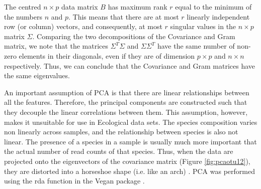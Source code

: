 The centred $n \times p$ data matrix $B$ has maximum rank $r$ equal to the minimum of the numbers $n$ and $p$. This means that there are at most $r$ linearly independent row (or column) vectors, and consequently, at most $r$ singular values in the $n \times p$ matrix $\Sigma$. Comparing the two decompositions of the Covariance and Gram matrix, we note that the matrices $\Sigma^T \Sigma$ and $\Sigma \Sigma^T$ have the same number of non-zero elements in their diagonals, even if they are of dimension $p \times p$ and $n \times n$ respectively. Thus, we can conclude that the Covariance and Gram matrices have the same eigenvalues.




An important assumption of PCA is that there are linear relationships between all the features. Therefore, the principal components are constructed such that they decouple the linear correlations between them. This assumption, however, makes it unsuitable for use in Ecological data sets. The species composition varies non linearly across samples, and the relationship between species is also not linear. The presence of a species in a sample is usually much more important that the actual number of read counts of that species. Thus, when the data are projected onto the eigenvectors of the covariance matrix (Figure \ref{fig:pcaotu12}), they are distorted into a horseshoe shape (i.e. like an arch) \cite{gauch_noise_1982}. PCA was performed using the rda function in the Vegan package \cite{oksanen_vegan_nodate,oksanen_multivariate_nodate}.

